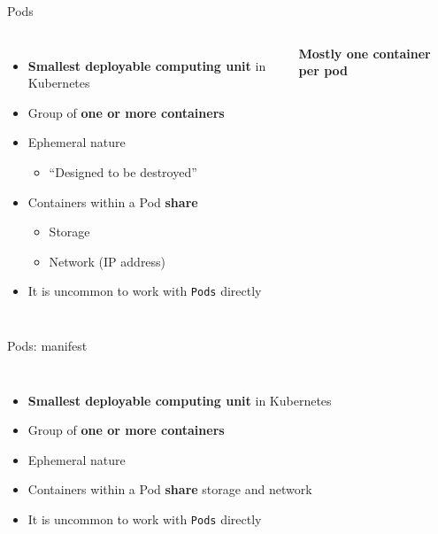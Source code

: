 
\begin{frame}{Pods}
  \begin{columns}[c]
      \begin{itemize}
        \item {\color{wsorange}\textbf{Smallest deployable computing unit}} in Kubernetes
        \item Group of {\color{wsorange}\textbf{one or more containers}}
        \item Ephemeral nature
          \begin{itemize}\item ``Designed to be destroyed''\end{itemize}
        \item Containers within a Pod {\color{wsorange}\textbf{share}}
          \begin{itemize}\item Storage \item Network (IP address)\end{itemize}
        \item It is uncommon to work with \texttt{Pods} directly
      \end{itemize}
      \centering
      \par\smallskip
      \colorbox{wsyellow}{\bfseries\small Mostly one container per pod}
  \end{columns}
\end{frame}

\begin{frame}[fragile]{Pods: manifest}
  \begin{columns}[c]
      \begin{itemize}
        \item {\color{wsorange}\textbf{Smallest deployable computing unit}} in Kubernetes
        \item Group of {\color{wsorange}\textbf{one or more containers}}
        \item Ephemeral nature
        \item Containers within a Pod {\color{wsorange}\textbf{share}} storage and network
        \item It is uncommon to work with \texttt{Pods} directly
      \end{itemize}
  \end{columns}
\end{frame}

